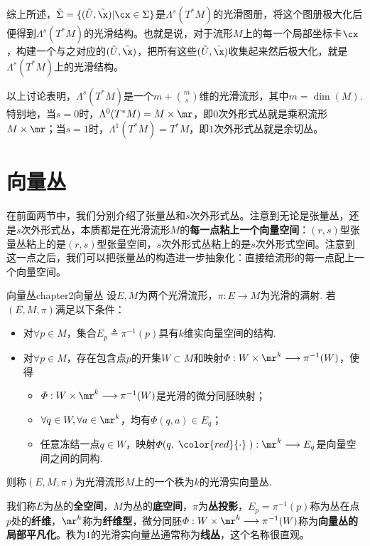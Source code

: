 综上所述，$\tilde{  \Sigma  }=\{(\tilde{  U  },\tilde{  \x  }) | \cx\in \Sigma\}$是$\Lambda^{s}(T^{\ast}M)$的光滑图册，将这个图册极大化后便得到$\Lambda^{s}(T^{\ast}M)$的光滑结构。也就是说，对于流形$M$上的每一个局部坐标卡$\cx$，构建一个与之对应的$(\tilde{U},\tilde{\x})$，把所有这些$(\tilde{U},\tilde{\x})$收集起来然后极大化，就是$\Lambda^{s}(T^{\ast}M)$上的光滑结构。

以上讨论表明，$\Lambda^{s}(T^{\ast}M)$是一个$m+\binom{m}{s}$维的光滑流形，其中$m=\operatorname{dim}(M)$. 特别地，当$s=0$时，$\Lambda^{0}(T^{\ast}M)=M\times \mr$，即$0$次外形式丛就是乘积流形$M\times \mr$；当$s=1$时，$\Lambda^{1}(T^{\ast}M)=T^{\ast}M$，即$1$次外形式丛就是余切丛。

\section{向量丛}

在前面两节中，我们分别介绍了张量丛和$s$次外形式丛。注意到无论是张量丛，还是$s$次外形式丛，本质都是在光滑流形$M$的\textbf{每一点粘上一个向量空间}：$(r,s)$型张量丛粘上的是$(r,s)$型张量空间，$s$次外形式丛粘上的是$s$次外形式空间。注意到这一点之后，我们可以把张量丛的构造进一步抽象化：直接给流形的每一点配上一个向量空间。

\begin{mydef}{向量丛}{chapter2向量丛}
	设$E,M$为两个光滑流形，$\pi:E\longrightarrow M$为光滑的满射. 若$(E,M,\pi)$满足以下条件：
	\begin{itemize}
		\item[(1)] 对$\forall p\in M$，集合$E_{p}\triangleq \pi^{-1}(p)$具有$k$维实向量空间的结构.
		\item[(2)] 对$\forall p\in M$，存在包含点$p$的开集$W\subset M$和映射$\varPhi:W\times \mr^{k}\longrightarrow \pi^{-1}(W)$，使得
		\begin{itemize}
			\item[$\bullet$] $\varPhi:W\times \mr^{k}\longrightarrow \pi^{-1}(W)$是光滑的微分同胚映射；
			\item[$\bullet$] $\forall q\in W,\forall a\in \mr^{k}$，均有$\varPhi(q,a)\in E_{q}$；
			\item[$\bullet$]  任意冻结一点$q\in W$，映射$\varPhi(q,\;{\color{red}{\cdot}}\;): \mr^{k}\longrightarrow E_{q}$是向量空间之间的同构.
		\end{itemize}
	\end{itemize}
则称$(E,M,\pi)$为光滑流形$M$上的一个秩为$k$的光滑实向量丛. 
\end{mydef}

我们称$E$为丛的\textbf{全空间}，$M$为丛的\textbf{底空间}，$\pi$为\textbf{丛投影}，$E_{p}=\pi^{-1}(p)$称为丛在点$p$处的\textbf{纤维}，$\mr^{k}$称为\textbf{纤维型}，微分同胚$\varPhi:W\times \mr^{k}\longrightarrow \pi^{-1}(W)$称为\textbf{向量丛的局部平凡化}。秩为$1$的光滑实向量丛通常称为\textbf{线丛}，这个名称很直观。

